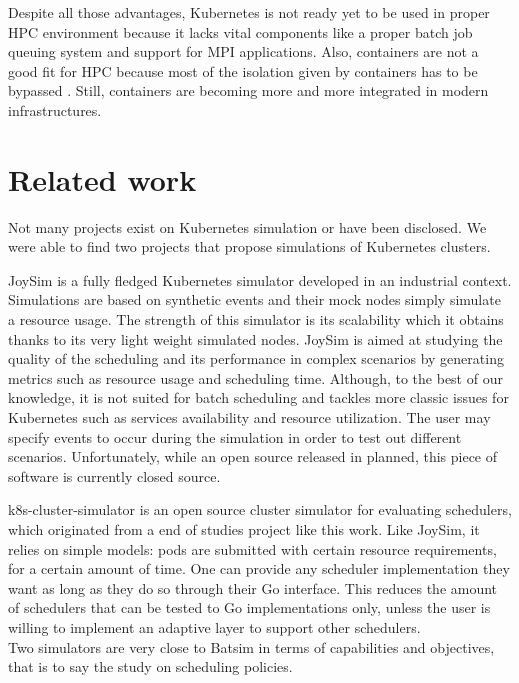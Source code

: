 Despite all those advantages, Kubernetes is not ready yet to be used in proper
HPC environment because it lacks vital components like a proper batch job
queuing system and support for MPI applications. Also, containers are not a
good fit for HPC because most of the isolation given by containers has to be
bypassed \cite{mercier:tel-02284996}. Still, containers are becoming more and
more integrated in modern infrastructures.

\section{Related work}

Not many projects exist on Kubernetes simulation or have been disclosed. We
were able to find two projects that propose simulations of Kubernetes clusters.

JoySim \cite{joysim} is a fully fledged Kubernetes simulator developed in an
industrial context. Simulations are based on synthetic events and their mock
nodes simply simulate a resource usage. The strength of this simulator is its
scalability which it obtains thanks to its very light weight simulated nodes.
JoySim is aimed at studying the quality of the scheduling and its performance
in complex scenarios by generating metrics such as resource usage and
scheduling time. Although, to the best of our knowledge, it is not suited for
batch scheduling and tackles more classic issues for Kubernetes such as
services availability and resource utilization.  The user may specify events to
occur during the simulation in order to test out different scenarios.
Unfortunately, while an open source released in planned, this piece of software
is currently closed source.

k8s-cluster-simulator \cite{k8s-cluster-simulator} is an open source cluster
simulator for evaluating schedulers, which originated from a end of studies
project like this work. Like JoySim, it relies on simple models: pods are
submitted with certain resource requirements, for a certain amount of time. One
can provide any scheduler implementation they want as long as they do so
through their Go interface. This reduces the amount of schedulers that can be
tested to Go implementations only, unless the user is willing to
implement an adaptive layer to support other schedulers.\\

Two simulators are very close to Batsim in terms of capabilities and
objectives, that is to say the study on scheduling policies.

